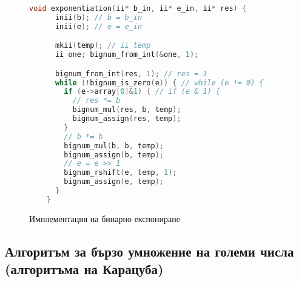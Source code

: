   \begin{figure}[p]
    \caption{Имплементация на бинарно експониране}
    \label{fig:binexp}
    \begin{lstlisting}[language=C]
    void exponentiation(ii* b_in, ii* e_in, ii* res) {
      inii(b); // b = b_in
      inii(e); // e = e_in

      mkii(temp); // ii temp
      ii one; bignum_from_int(&one, 1);

      bignum_from_int(res, 1); // res = 1
      while (!bignum_is_zero(e)) { // while (e != 0) {
        if (e->array[0]&1) { // if (e & 1) {
          // res *= b
          bignum_mul(res, b, temp);
          bignum_assign(res, temp);
        }
        // b *= b
        bignum_mul(b, b, temp);
        bignum_assign(b, temp);
        // e = e >> 1
        bignum_rshift(e, temp, 1);
        bignum_assign(e, temp);
      }
    }
    \end{lstlisting}
  \end{figure}

  \subsection{Алгоритъм за бързо умножение на големи числа (алгоритъма на Карацуба)} \label{karatsuba}

